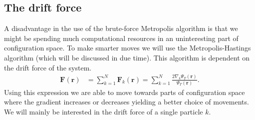 \documentclass[
    a4paper, aps, twocolumn, floatfix, superscriptaddress, nofootinbib]{revtex4-1}
\newcommand{\vf}{\mathbf}
\newcommand{\1}{\mathds{1}}
\begin{document}
    \subsection{The drift force}
        A disadvantage in the use of the brute-force Metropolis algorithm is
        that we might be spending much computational resources in an
        uninteresting part of configuration space. To make smarter moves we will
        use the Metropolis-Hastings algorithm (which will be discussed in due
        time). This algorithm is dependent on the drift force of the system.
        \begin{align}
            \vf{F}(\vf{r})
            &=
            \sum_{k = 1}^N
            \vf{F}_k(\vf{r})
            =
            \sum_{k = 1}^N
            \frac{2\nabla_k\Psi_T(\vf{r})}{\Psi_T(\vf{r})}.
            \label{eq:drift_force}
        \end{align}
        Using this expression we are able to move towards parts of
        configuration space where the gradient increases or decreases yielding a
        better choice of movements. We will mainly be interested in the drift
        force of a single particle $k$.
\end{document}

